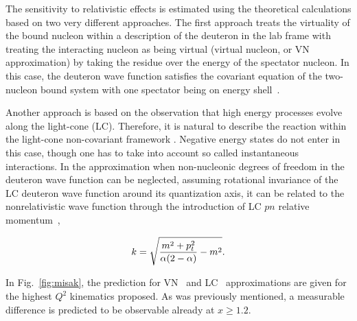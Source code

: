 The sensitivity to relativistic effects is estimated using the theoretical calculations based on two 
very different approaches.   The first approach treats the  virtuality of the bound nucleon within a
description of the deuteron in the lab frame  with treating the interacting nucleon as being 
virtual (virtual nucleon, or VN approximation) 
by taking the residue over the energy of the spectator nucleon.
In this case, the deuteron wave function satisfies the covariant equation of the two-nucleon bound system 
with one spectator being on energy shell~\cite{Sargsian:2009hf,Gross:2010qm}.

Another approach is based on the observation that high energy processes
evolve along the light-cone (LC).  Therefore, it is natural to describe the 
reaction within the light-cone non-covariant framework \cite{Frankfurt:1981mk}. 
Negative energy states do not enter in this case, though one has to take into 
account so called instantaneous interactions.
In the approximation when non-nucleonic degrees of freedom in the
deuteron wave function can be neglected, assuming rotational invariance of the LC deuteron wave function around its quantization axis, it can be related to the nonrelativistic wave function through the introduction of LC $pn$ relative momentum~\cite{Frankfurt:1981mk, Miller:2009fc},

\begin{equation}
k=\sqrt{{m^2+p_t^2\over \alpha(2-\alpha)} - m^2}.
\end{equation}

In Fig.~\ref{fig:misak}, the prediction for VN~\cite{Sargsian:2009hf} and LC~\cite{Frankfurt:1993sp} approximations are given 
for the highest $Q^2$ kinematics proposed. As was previously mentioned, a measurable 
difference is predicted to be observable already at $x\ge 1.2$.
 
 


